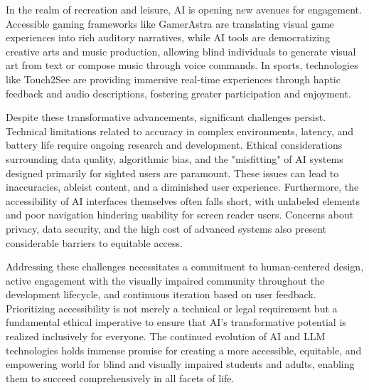 In the realm of recreation and leisure, AI is opening new avenues for engagement. Accessible gaming frameworks like GamerAstra are translating visual game experiences into rich auditory narratives, while AI tools are democratizing creative arts and music production, allowing blind individuals to generate visual art from text or compose music through voice commands. In sports, technologies like Touch2See are providing immersive real-time experiences through haptic feedback and audio descriptions, fostering greater participation and enjoyment.

Despite these transformative advancements, significant challenges persist. Technical limitations related to accuracy in complex environments, latency, and battery life require ongoing research and development. Ethical considerations surrounding data quality, algorithmic bias, and the "misfitting" of AI systems designed primarily for sighted users are paramount. These issues can lead to inaccuracies, ableist content, and a diminished user experience. Furthermore, the accessibility of AI interfaces themselves often falls short, with unlabeled elements and poor navigation hindering usability for screen reader users. Concerns about privacy, data security, and the high cost of advanced systems also present considerable barriers to equitable access.

Addressing these challenges necessitates a commitment to human-centered design, active engagement with the visually impaired community throughout the development lifecycle, and continuous iteration based on user feedback. Prioritizing accessibility is not merely a technical or legal requirement but a fundamental ethical imperative to ensure that AI's transformative potential is realized inclusively for everyone. The continued evolution of AI and LLM technologies holds immense promise for creating a more accessible, equitable, and empowering world for blind and visually impaired students and adults, enabling them to succeed comprehensively in all facets of life.
